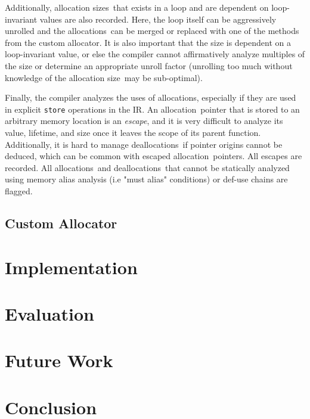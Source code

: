 \documentclass{article}
\def\ALL{allocation}
\def\ALLS{allocations}
\def\DALLS{deallocations}
\def\SIZE{allocation size}
\def\SIZES{allocation sizes}
\begin{document}
Additionally, \SIZES\ that exists in a loop and are dependent on loop-invariant
values are also recorded. Here, the loop itself can be aggressively unrolled and
the \ALLS\ can be merged or replaced with one of the methods from the custom 
allocator. It is also important that the size is dependent on a loop-invariant 
value, or else the compiler cannot affirmatively analyze multiples of the size or
determine an appropriate unroll factor (unrolling too much without knowledge of
the \SIZE\ may be sub-optimal).

Finally, the compiler analyzes the uses of \ALLS , especially if they are used
in explicit \texttt{store} operations in the IR. An \ALL\ pointer that is stored
to an arbitrary memory location is an \textit{escape}, and it is very difficult
to analyze its value, lifetime, and size once it leaves the scope of its parent
function. Additionally, it is hard to manage \DALLS\ if pointer origins
cannot be deduced, which can be common with escaped \ALL\ pointers. All escapes
are recorded. All \ALLS\ and \DALLS\ that cannot be statically analyzed using
memory alias analysis (i.e "must alias" conditions) or def-use chains are flagged.

\subsection{Custom Allocator} \label{ca}

\section{Implementation}

\section{Evaluation}

\section{Future Work}

\section{Conclusion}



\end{document}
